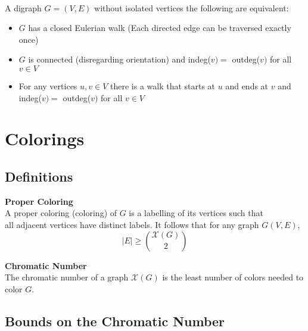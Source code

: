 \documentclass[12pt]{article}
\begin{document}
	\begin{tcolorbox}
	\\
	A digraph $G = (V,E)$ without isolated vertices the following are equivalent: 
	\begin{itemize}
	 \item $G$ has a closed Eulerian walk (Each directed edge can be traversed exactly once)
	 \item $G$ is connected (disregarding orientation) and indeg($v) =$ outdeg($v)$ for all $v \in V$
	 \item For any vertices $u,v \in V$ there is a walk that starts at $u$ and ends at $v$ and\\
	  indeg($v) =$ outdeg($v)$ for all $v \in V$
	 \end{itemize}
	\end{tcolorbox}
	
	
\section{Colorings}
\begin{center} \end{center}
\vspace{-1em}

	\subsection{Definitions}
	\begin{center} \end{center}
	
	
	\begin{tcolorbox}
	\textbf{Proper Coloring} \\
	\null \quad A proper coloring (coloring) of $G$ is a labelling of its vertices such that \\
	\null \quad  all adjacent vertices have distinct labels. It follows that for any graph $G(V,E)$,\\ 
	$$|E| \ge {\mathcal{X}(G)  \choose 2}$$
	
	\textbf{Chromatic Number} \\
	\null \quad The chromatic number of a graph $\mathcal{X}(G)$ is the least number of colors needed to color $G$. \\

	\end{tcolorbox}
	
	
	\subsection{Bounds on the Chromatic Number}
	\begin{center} \end{center}
	
\end{document}
